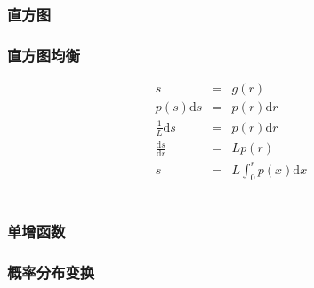 \documentclass{beamer}
\newcommand{\mathd}{\mathrm{d}}
\newcommand{\nospace}{}
\begin{document}
{{\begin{frame}
  \
  
  \
  
\end{frame}}{\begin{frame}
  \frametitle{直方图}
  
  \label{4_image_histograms}
\end{frame}}{\begin{frame}
  \frametitle{直方图均衡}
  \begin{eqnarray*}
    s & = & g (r)\\
    p (s) \mathd s & = & p (r) \mathd r\\
    \frac{1}{L} \mathd s & = & p (r) \mathd r\\
    \frac{\mathd s}{\mathd r} & = & L \nospace p (r)\\
    s & = & L \int_0^r p (x) \mathd x
  \end{eqnarray*}
  $\label{histogram-equalization}$
\end{frame}}{\begin{frame}
  \frametitle{单增函数}
  
\end{frame}}{\begin{frame}
  \frametitle{概率分布变换}
  

\end{frame}}}
\end{document}
